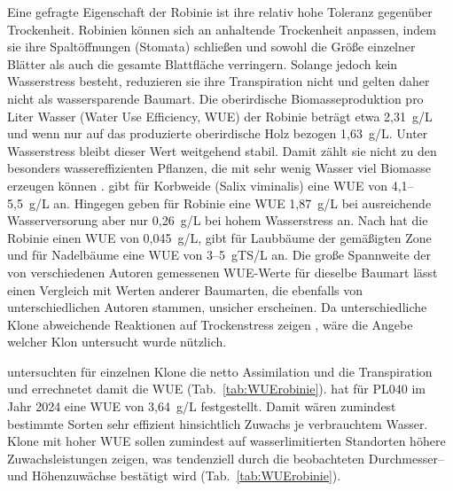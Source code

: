 \documentclass[twocolumn]{scrartcl}
\begin{document}
Eine gefragte Eigenschaft der Robinie ist ihre relativ hohe Toleranz
gegenüber Trockenheit. Robinien können sich an anhaltende Trockenheit
anpassen, indem sie ihre Spaltöffnungen (Stomata) schließen und sowohl
die Größe einzelner Blätter als auch die gesamte Blattfläche
verringern. Solange jedoch kein Wasserstress besteht, reduzieren sie
ihre Transpiration nicht und gelten daher nicht als wassersparende
Baumart.  Die oberirdische Biomasseproduktion pro Liter Wasser (Water Use
Efficiency, WUE) der Robinie beträgt etwa 2,31~g/L und wenn nur auf das
produzierte oberirdische Holz bezogen 1,63~g/L. Unter Wasserstress
bleibt dieser Wert weitgehend stabil. Damit zählt sie nicht zu
den besonders wassereffizienten Pflanzen, die mit sehr wenig Wasser
viel Biomasse erzeugen können \citep{mantovani2014robinieWasser}.
\citet{lindroth1994wasserverbrauchWeide} gibt für Korbweide (Salix viminalis)
eine WUE von 4,1--5,5~g/L an.
Hingegen \citet{ombodi2022robinieWasserverbrauch} geben für Robinie
eine WUE 1,87~g/L bei ausreichende Wasserversorung aber nur 0,26~g/L bei
hohem Wasserstress an.
Nach \citet{raper1992robinieWasserverbrauch} hat die Robinie einen
WUE von 0,045~g/L,
\citet[S.~126]{lacher2001OekophysiologieDerPflanzen} gibt für
Laubbäume der gemäßigten Zone und für Nadelbäume eine WUE von 3--5~gTS/L an.
Die große Spannweite der von verschiedenen Autoren gemessenen
WUE-Werte für dieselbe Baumart lässt einen Vergleich mit Werten
anderer Baumarten, die ebenfalls von unterschiedlichen Autoren
stammen, unsicher erscheinen.
Da unterschiedliche Klone abweichende Reaktionen auf Trockenstress zeigen
\citep{mapelli2019robinieTrockenstress},
wäre die Angebe welcher Klon untersucht wurde nützlich.

\citet{abri2022robinieTrokenresistenz,abri2023robiieWasser,abri2023robinieDroughtTolerance}
untersuchten für einzelnen Klone die netto Assimilation und die
Transpiration und errechnetet damit die WUE (Tab.~\ref{tab:WUErobinie}).
\citet{abri2025robinieTrockenheit} hat für PL040 im Jahr 2024 eine WUE von
3,64~g/L festgestellt.
Damit wären zumindest bestimmte Sorten sehr effizient hinsichtlich
Zuwachs je verbrauchtem Wasser. Klone mit hoher WUE sollen zumindest
auf wasserlimitierten Standorten höhere Zuwachsleistungen zeigen, was
tendenziell durch die beobachteten Durchmesser-- und Höhenzuwächse bestätigt
wird (Tab.~\ref{tab:WUErobinie}).
\end{document}

